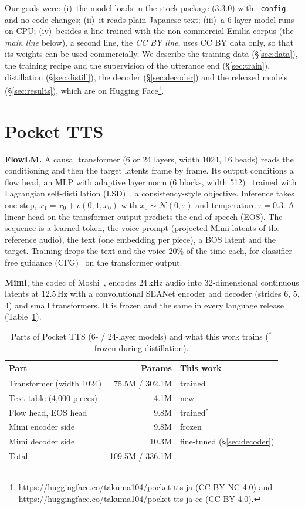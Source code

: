 \documentclass[10pt,a4paper,twocolumn]{article}
\begin{document}
Our goals were: (i)~the model loads in the stock package (3.3.0) with \texttt{--config} and no code
changes; (ii)~it reads plain Japanese text; (iii)~a 6-layer model runs on CPU; (iv)~besides a line
trained with the non-commercial Emilia corpus (the \emph{main line} below), a second line, the
\emph{CC BY line}, uses CC BY data only, so that its weights can be used commercially. We describe the training data (\S\ref{sec:data}), the training
recipe and the supervision of the utterance end (\S\ref{sec:train}), distillation (\S\ref{sec:distill}),
the decoder (\S\ref{sec:decoder}) and the released models (\S\ref{sec:results}), which are on Hugging
Face\footnote{\url{https://huggingface.co/takuma104/pocket-tts-ja} (CC BY-NC 4.0) and
\url{https://huggingface.co/takuma104/pocket-tts-ja-cc} (CC BY 4.0).}.

\section{Pocket TTS}\label{sec:arch}
\textbf{FlowLM.} A causal transformer (6 or 24 layers, width 1024, 16 heads) reads the conditioning
and then the target latents frame by frame. Its output conditions a flow head, an MLP with adaptive
layer norm (6 blocks, width 512)~\cite{mar} trained with Lagrangian self-distillation
(LSD)~\cite{lsd}, a consistency-style objective. Inference takes one step,
$x_1=x_0+v(0,1,x_0)$ with $x_0\sim\mathcal{N}(0,\tau)$ and temperature $\tau=0.3$. A linear head on
the transformer output predicts the end of speech (EOS). The sequence is a learned token, the voice
prompt (projected Mimi latents of the reference audio), the text (one embedding per piece), a BOS
latent and the target. Training drops the text and the voice 20\% of the time each, for
classifier-free guidance (CFG)~\cite{cfg} on the transformer output.

\textbf{Mimi}, the codec of Moshi~\cite{moshi}, encodes 24\,kHz audio into 32-dimensional continuous
latents at 12.5\,Hz with a convolutional SEANet encoder and decoder (strides 6, 5, 4) and small
transformers. It is frozen and the same in every language release (Table~\ref{tab:arch}).

\begin{table}[t]
\centering\footnotesize\setlength{\tabcolsep}{3pt}
\caption{Parts of Pocket TTS (6- / 24-layer models) and what this work trains ($^\ast$frozen during
distillation).}
\label{tab:arch}
\begin{tabular}{@{}lrl@{}}
\toprule
Part & Params & This work\\
\midrule
Transformer (width 1024) & 75.5M / 302.1M & trained\\
Text table (4,000 pieces) & 4.1M & new\\
Flow head, EOS head & 9.8M & trained$^\ast$\\
Mimi encoder side & 9.8M & frozen\\
Mimi decoder side & 10.3M & fine-tuned (\S\ref{sec:decoder})\\
\midrule
Total & 109.5M / 336.1M &\\
\bottomrule
\end{tabular}
\end{table}
\end{document}
